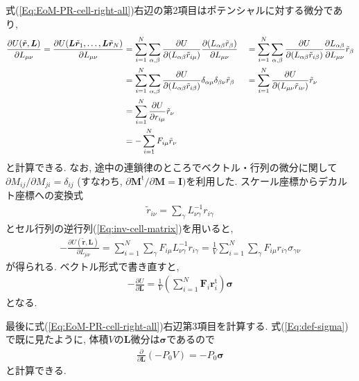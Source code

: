 式(\ref{Eq:EoM-PR-cell-right-all})右辺の第2項目はポテンシャルに対する微分であり,
\begin{alignat}{4}
  \frac{\partial U(\tilde{\bm{r}}, \bm{L})}{\partial L_{\mu\nu}}
  =
  \frac{\partial U(\bm{L}\tilde{\bm{r}}_{1},\ldots,\bm{L}\tilde{\bm{r}}_{N})}{\partial L_{\mu\nu}}
  &=
  \sum_{i=1}^{N}\sum_{\alpha,\beta}
  \frac{\partial U}{\partial (L_{\alpha\beta} \Tilde{r}_{i\mu})}
  \frac{\partial (L_{\alpha\beta}\tilde{r}_{\beta})}{\partial L_{\mu\nu}}
  &&=
  \sum_{i=1}^{N}\sum_{\alpha,\beta}
  \frac{\partial U}{\partial (L_{\alpha\beta} \Tilde{r}_{i\beta})}
  \frac{\partial L_{\alpha\beta}}{\partial L_{\mu\nu}} \tilde{r}_{\beta}
  \\
  &=
  \sum_{i=1}^{N}\sum_{\alpha,\beta}
  \frac{\partial U}{\partial (L_{\alpha\beta} \Tilde{r}_{i\beta})}
  \delta_{\alpha\mu}\delta_{\beta\nu}\tilde{r}_{\beta}
  &&=
  \sum_{i=1}^{N}
  \frac{\partial U}{\partial (L_{\mu\nu} \Tilde{r}_{i\nu})}
  \tilde{r}_{\nu}
  \\
  &=
  \sum_{i=1}^{N}
  \frac{\partial U}{\partial r_{i\mu}} \tilde{r}_{\nu}
  \\
  &=
  -\sum_{i=1}^{N}
  F_{i\mu} \tilde{r}_{\nu}
\end{alignat}
と計算できる. なお, 途中の連鎖律のところでベクトル・行列の微分に関して$\partial M_{ij}/\partial M_{ji} = \delta_{ij}$ (すなわち, $\partial \bm{M}^{\mathrm{t}}/\partial \bm{M} = \bm{I})$を利用した. スケール座標からデカルト座標への変換式
\begin{align}
  \tilde{r}_{i\nu} = \sum_{\gamma} L_{\nu\gamma}^{-1} r_{i\gamma}
\end{align}
とセル行列の逆行列(\ref{Eq:inv-cell-matrix})を用いると,
\begin{align}
  -\frac{\partial U(\tilde{\bm{r}}, \bm{L})}{\partial L_{\mu\nu}}
  =
  \sum_{i=1}^{N} \sum_{\gamma}
  F_{i\mu} L_{\nu\gamma}^{-1} r_{i\gamma}
  =
  \frac{1}{V}
  \sum_{i=1}^{N} \sum_{\gamma}
  F_{i\mu} r_{i\gamma} \sigma_{\gamma\nu}
\end{align}
が得られる. ベクトル形式で書き直すと,
\begin{align}
  -\frac{\partial U}{\partial \bm{L}}
  =
  \frac{1}{V}
  \left(
    \sum_{i=1}^{N}
    \bm{F}_{i} \bm{r}_{i}^{\mathrm{t}}
  \right)
  \bm{\sigma}
  \label{Eq:EoM-PR-cell-right2}
\end{align}
となる.

最後に式(\ref{Eq:EoM-PR-cell-right-all})右辺第3項目を計算する.
式(\ref{Eq:def-sigma})で既に見たように, 体積$V$の$\bm{L}$微分は$\bm{\sigma}$であるので
\begin{align}
  \frac{\partial}{\partial \bm{L}}(-P_{0} V) = -P_{0} \bm{\sigma}
  \label{Eq:EoM-PR-cell-right3}
\end{align}
と計算できる.

